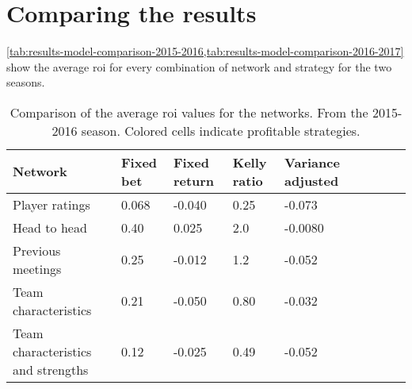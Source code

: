 \section{Comparing the results}

\cref{tab:results-model-comparison-2015-2016,tab:results-model-comparison-2016-2017} show the average \gls{roi} for every combination of network and strategy for the two seasons.

\begin{table}
    \centering
    \begin{tabulary}{\textwidth}{| L || L |  L |  L |  L | L |  L |  L |  L |}
        \hline
        \textbf{Network}                    & \textbf{Fixed bet}        & \textbf{Fixed return}     & \textbf{Kelly ratio}      & \textbf{Variance adjusted} \\\hline
        Player ratings                      &  0.068 & -0.040                    &  0.25  & -0.073 \\\hline
        Head to head                        &  0.40  &  0.025 &  2.0   & -0.0080 \\\hline
        Previous meetings                   &  0.25  & -0.012                    &  1.2   & -0.052 \\\hline
        Team characteristics                &  0.21  & -0.050                    &  0.80  & -0.032 \\\hline
        Team characteristics and strengths  &  0.12  & -0.025                    &  0.49  & -0.052 \\\hline
    \end{tabulary}
    \caption{Comparison of the average \gls{roi} values for the networks. From the 2015-2016 season. Colored cells indicate profitable strategies.}
    \label{tab:results-model-comparison-2015-2016} 
\end{table}

